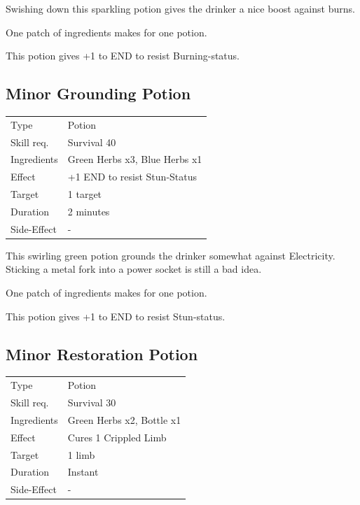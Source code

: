 \documentclass[11pt,a4paper,twocolumn]{book}
\begin{document}
\medskip

Swishing down this sparkling potion gives the drinker a nice boost against burns.

One patch of ingredients makes for one potion.

This potion gives +1 to END to resist Burning-status.


\subsection*{Minor Grounding Potion}
{
	\begin{tabu} to 75mm{| X[l,4] | X[l,8] |}
		\hline
		Type 			& Potion 													\\
        Skill req.	    & Survival 40 												\\
        Ingredients     & Green Herbs x3, Blue Herbs x1								\\
        Effect     		& +1 END to resist Stun-Status 								\\
        Target      	& 1 target													\\
        Duration  		& 2 minutes	 												\\
        Side-Effect     & -															\\ \hline
	\end{tabu}
		
}

\medskip

This swirling green potion grounds the drinker somewhat against Electricity. Sticking a metal fork into a power socket is still a bad idea.

One patch of ingredients makes for one potion.

This potion gives +1 to END to resist Stun-status.


\subsection*{Minor Restoration Potion}
{
	\begin{tabu} to 75mm{| X[l,4] | X[l,8] |}
		\hline
		Type 			& Potion 													\\
        Skill req.	    & Survival 30 												\\
        Ingredients     & Green Herbs x2, Bottle x1									\\
        Effect     		& Cures 1 Crippled Limb 									\\
        Target      	& 1 limb													\\
        Duration  		& Instant	 												\\
        Side-Effect     & -															\\ \hline
	\end{tabu}
		
}
\end{document}
